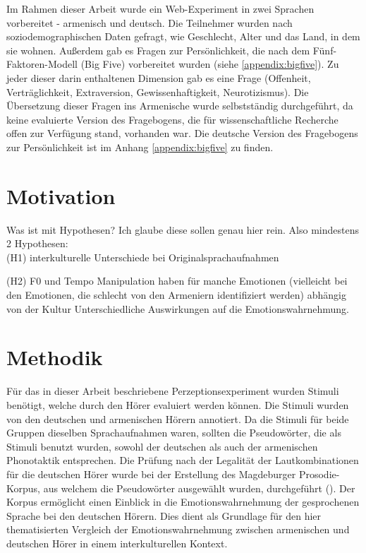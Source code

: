 \documentclass[11pt,a4paper,headsepline,twoside,toc=bibliography]{scrreprt}
\begin{document}
Im Rahmen dieser Arbeit wurde ein Web-Experiment in zwei Sprachen vorbereitet - armenisch und deutsch. Die Teilnehmer wurden nach soziodemographischen Daten gefragt, wie Geschlecht, Alter und das Land, in dem sie wohnen. Außerdem gab es Fragen zur Persönlichkeit, die nach dem Fünf-Faktoren-Modell (Big Five) vorbereitet wurden (siehe \ref{appendix:bigfive}). Zu jeder dieser darin enthaltenen Dimension gab es eine Frage (Offenheit, Verträglichkeit, Extraversion, Gewissenhaftigkeit, Neurotizismus). Die Übersetzung dieser Fragen ins Armenische wurde selbstständig durchgeführt, da keine evaluierte Version des Fragebogens, die für wissenschaftliche Recherche offen zur Verfügung stand, vorhanden war. Die deutsche Version des Fragebogens zur Persönlichkeit ist im Anhang \ref{appendix:bigfive} zu finden. 



\section{Motivation}
\label{sec:experimemnt_motivation}


Was ist mit Hypothesen? Ich glaube diese sollen genau hier rein. Also mindestens 2 Hypothesen:\\

(H1) interkulturelle Unterschiede bei Originalsprachaufnahmen

(H2) F0 und Tempo Manipulation haben für manche Emotionen (vielleicht bei den Emotionen, die schlecht von den Armeniern identifiziert werden) abhängig von der Kultur Unterschiedliche Auswirkungen auf die Emotionswahrnehmung.  

\section{Methodik}
\label{sec:method}

Für das in dieser Arbeit beschriebene Perzeptionsexperiment wurden Stimuli benötigt, welche durch den Hörer evaluiert werden können. Die Stimuli wurden von den deutschen und armenischen Hörern annotiert. Da die Stimuli für beide Gruppen dieselben Sprachaufnahmen waren, sollten die Pseudowörter, die als Stimuli benutzt wurden, sowohl der deutschen als auch der armenischen Phonotaktik entsprechen. Die Prüfung nach der Legalität der Lautkombinationen für die deutschen Hörer wurde bei der Erstellung des Magdeburger Prosodie-Korpus, aus welchem die Pseudowörter ausgewählt wurden, durchgeführt (\cite{Wendt2002}). Der Korpus ermöglicht einen Einblick in die Emotionswahrnehmung der gesprochenen Sprache bei den deutschen Hörern. Dies dient als Grundlage für den hier thematisierten Vergleich der Emotionswahrnehmung zwischen armenischen und deutschen Hörer in einem interkulturellen Kontext.\\
\end{document}
